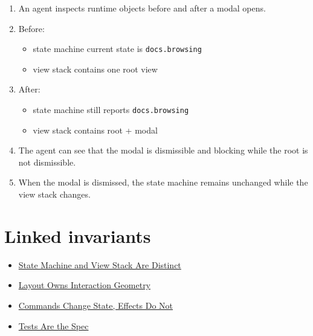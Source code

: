 \begin{enumerate}
\def\labelenumi{\arabic{enumi}.}
\tightlist
\item
  An agent inspects runtime objects before and after a modal opens.
\item
  Before:

  \begin{itemize}
  \tightlist
  \item
    state machine current state is \texttt{d\allowbreak{}o\allowbreak{}c\allowbreak{}s\allowbreak{}.\allowbreak{}b\allowbreak{}r\allowbreak{}o\allowbreak{}w\allowbreak{}s\allowbreak{}i\allowbreak{}n\allowbreak{}g}
  \item
    view stack contains one root view
  \end{itemize}
\item
  After:

  \begin{itemize}
  \tightlist
  \item
    state machine still reports \texttt{d\allowbreak{}o\allowbreak{}c\allowbreak{}s\allowbreak{}.\allowbreak{}b\allowbreak{}r\allowbreak{}o\allowbreak{}w\allowbreak{}s\allowbreak{}i\allowbreak{}n\allowbreak{}g}
  \item
    view stack contains root + modal
  \end{itemize}
\item
  The agent can see that the modal is dismissible and blocking while the root is not dismissible.
\item
  When the modal is dismissed, the state machine remains unchanged while the view stack changes.
\end{enumerate}

\section{Linked invariants}\label{record-150-linked-invariants}

\begin{itemize}
\tightlist
\item
  \href{https://github.com/flyingrobots/bijou/blob/cbd70612140e7a450d764b3c7be1c6af878b99bc/docs/invariants/state-machine-and-view-stack-are-distinct.md}{State Machine and View Stack Are Distinct}
\item
  \href{https://github.com/flyingrobots/bijou/blob/cbd70612140e7a450d764b3c7be1c6af878b99bc/docs/invariants/layout-owns-interaction-geometry.md}{Layout Owns Interaction Geometry}
\item
  \href{https://github.com/flyingrobots/bijou/blob/cbd70612140e7a450d764b3c7be1c6af878b99bc/docs/invariants/commands-change-state-effects-do-not.md}{Commands Change State, Effects Do Not}
\item
  \href{https://github.com/flyingrobots/bijou/blob/cbd70612140e7a450d764b3c7be1c6af878b99bc/docs/invariants/tests-are-the-spec.md}{Tests Are the Spec}
\end{itemize}

